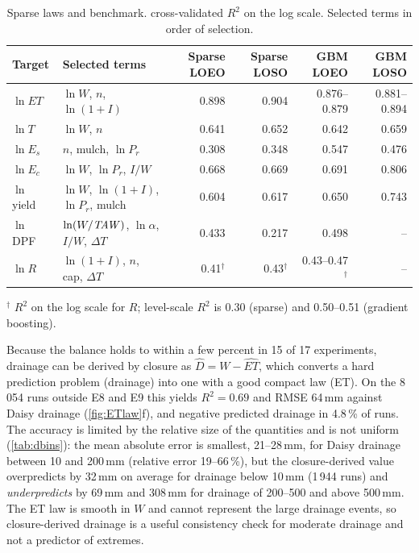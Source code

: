 \begin{table}[H]\centering\small
\caption{Sparse laws and benchmark. cross-validated $R^2$ on the log scale. Selected terms in order of selection.}
\label{tab:laws}
\footnotesize\setlength{\tabcolsep}{4pt}
\begin{tabular}{llrrrr}
\toprule
Target & Selected terms & Sparse LOEO & Sparse LOSO & GBM LOEO & GBM LOSO\\\midrule
$\ln\mathit{ET}$ & $\ln W$, $n$, $\ln(1+I)$ & 0.898 & 0.904 & 0.876--0.879 & 0.881--0.894\\
$\ln T$ & $\ln W$, $n$ & 0.641 & 0.652 & 0.642 & 0.659\\
$\ln E_s$ & $n$, mulch, $\ln P_r$ & 0.308 & 0.348 & 0.547 & 0.476\\
$\ln E_c$ & $\ln W$, $\ln P_r$, $I/W$ & 0.668 & 0.669 & 0.691 & 0.806\\
$\ln$ yield & $\ln W$, $\ln(1+I)$, $\ln P_r$, mulch & 0.604 & 0.617 & 0.650 & 0.743\\
$\ln$ DPF & $\ln(W/\mathit{TAW})$, $\ln\alpha$, $I/W$, $\Delta T$ & 0.433 & 0.217 & 0.498 & --\\
$\ln R$ & $\ln(1+I)$, $n$, cap, $\Delta T$ & 0.41$^{\dagger}$ & 0.43$^{\dagger}$ & 0.43--0.47$^{\dagger}$ & --\\\bottomrule
\end{tabular}

\smallskip\noindent\footnotesize$^{\dagger}$ $R^2$ on the log scale for $R$; level-scale $R^2$ is 0.30 (sparse) and 0.50--0.51 (gradient boosting).
\end{table}

Because the balance holds to within a few percent in 15 of 17 experiments, drainage can be derived by closure as $\hat D=W-\widehat{\mathit{ET}}$, which converts a hard prediction problem (drainage) into one with a good compact law (ET). On the 8\,054 runs outside E8 and E9 this yields $R^2=0.69$ and RMSE 64\,mm against Daisy drainage (\cref{fig:ETlaw}f), and negative predicted drainage in 4.8\,\% of runs. The accuracy is limited by the relative size of the quantities and is not uniform (\cref{tab:dbins}): the mean absolute error is smallest, 21--28\,mm, for Daisy drainage between 10 and 200\,mm (relative error 19--66\,\%), but the closure-derived value overpredicts by 32\,mm on average for drainage below 10\,mm (1\,944 runs) and \emph{underpredicts} by 69\,mm and 308\,mm for drainage of 200--500 and above 500\,mm. The ET law is smooth in $W$ and cannot represent the large drainage events, so closure-derived drainage is a useful consistency check for moderate drainage and not a predictor of extremes.

